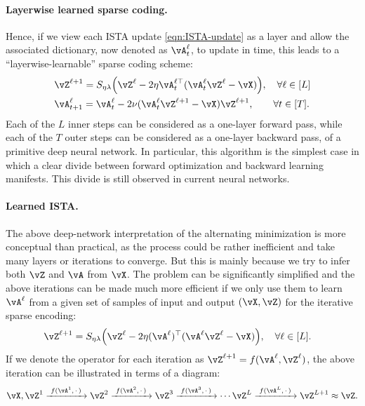 \documentclass[\toplevelprefix/book-main.tex]{subfiles}
\begin{document}
\paragraph{Layerwise learned sparse coding.}
Hence, if we view each ISTA update \eqref{eqn:ISTA-update} as a layer and allow the associated dictionary, now denoted as $\vA_t^\ell$, to update in time, this leads to a  ``layerwise-learnable'' sparse coding scheme:
\begin{align}
    & \vZ^{\ell + 1} = S_{\eta\lambda}\rp{\vZ^{\ell} - 2\eta\vA_{t}^{\ell\top}(\vA_{t}^\ell\vZ^{\ell} - \vX)}, \quad \forall \ell \in [L] \\ 
    & \vA_{t + 1}^\ell = \vA_{t}^\ell - 2\nu (\vA_{t}^\ell\vZ^{\ell + 1} - \vX)\vZ^{\ell + 1}, \qquad \forall t \in [T].
\end{align}
Each of the \(L\) inner steps can be considered as a one-layer  forward pass, while each of  the \(T\) outer steps can be considered as a one-layer  backward pass, of a primitive deep neural network. In particular, this algorithm is the simplest case in which a clear divide between forward optimization and backward learning manifests. This divide is still observed in current neural networks.

\paragraph{Learned ISTA.} The above deep-network  interpretation of the alternating minimization is more conceptual than practical, as the process could be rather inefficient and take many layers or iterations to converge. But this is mainly because we try to infer both \(\vZ\) and \(\vA\) from \(\vX\). The problem can be significantly simplified and the above iterations can be made much more efficient if we only use them to learn \(\vA^\ell\) from a given set of samples of input and output  \((\vX, \vZ)\) for the iterative sparse encoding:
\begin{align}
    & \vZ^{\ell + 1} = S_{\eta\lambda}\rp{\vZ^{\ell} - 2\eta(\vA^{\ell})^{\top}(\vA^\ell\vZ^{\ell} - \vX)}, \quad \forall \ell \in [L].
\end{align}
If we denote the operator for each iteration as $\vZ^{\ell + 1} = f(\vA^\ell, \vZ^\ell)$, the above iteration can be illustrated in terms of a diagram:
\begin{equation*}
\vX, \vZ^1 \xrightarrow{\hspace{1mm} f(\vA^1,\,\cdot\,) \hspace{1mm}}  \vZ^2 \xrightarrow{\hspace{1mm} f(\vA^2,\,\cdot\,) \hspace{1mm}}  \vZ^3  \xrightarrow{\hspace{1mm} f(\vA^3,\,\cdot\,) \hspace{1mm}} \cdots \vZ^{L}  \xrightarrow{\hspace{1mm} f(\vA^{L},\,\cdot\,) \hspace{1mm}} \vZ^{L + 1} \approx \vZ.  
\label{eqn:deep-sparse-encoding}
\end{equation*}
\end{document}
